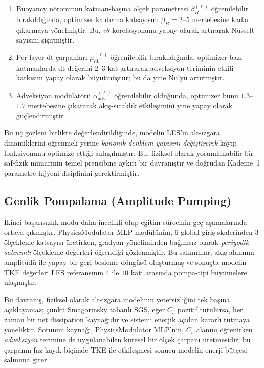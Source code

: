 \begin{enumerate}
  \item Buoyancy nöronunun katman-başına ölçek parametresi $\beta_{B}^{(\ell)}$ öğrenilebilir bırakıldığında, optimizer kaldırma katsayısını $\beta_{B}=2$--$5$ mertebesine kadar çıkarmaya yönelmiştir. Bu, $v\theta$ korelasyonunu yapay olarak artırarak Nusselt sayısını şişirmiştir.

  \item Per-layer dt çarpanları $\mu_{\mathrm{dt}}^{(\ell)}$ öğrenilebilir bırakıldığında, optimizer bazı katmanlarda dt değerini $2$--$3$ kat artırarak adveksiyon teriminin etkili katkısını yapay olarak büyütmüştür; bu da yine $\mathrm{Nu}$'yu artırmıştır.

  \item Adveksiyon modülatörü $\alpha_{\mathrm{adv}}^{(\ell)}$ öğrenilebilir olduğunda, optimizer bunu $1.3$--$1.7$ mertebesine çıkararak akış-sıcaklık etkileşimini yine yapay olarak güçlendirmiştir.
\end{enumerate}

Bu üç gözlem birlikte değerlendirildiğinde, modelin LES'in alt-ızgara dinamiklerini öğrenmek yerine \emph{kanonik denklem yapısını değiştirerek} kayıp fonksiyonunu optimize ettiği anlaşılmıştır. Bu, fiziksel olarak yorumlanabilir bir saf-fizik mimarinin temel prensibine aykırı bir davranıştır ve doğrudan Kademe~1 parametre hijyeni disiplinini gerektirmiştir.

\subsection{Genlik Pompalama (Amplitude Pumping)}

İkinci başarısızlık modu daha incelikli olup eğitim sürecinin geç aşamalarında ortaya çıkmıştır. PhysicsModulator MLP modülünün, 6 global giriş skalerinden 3 ölçekleme katsayısı üretirken, gradyan yöneliminden bağımsız olarak \emph{periyodik salınımlı} ölçekleme değerleri öğrendiği gözlenmiştir. Bu salınımlar, akış alanının amplitüdü ile yapay bir geri-besleme döngüsü oluşturmuş ve sonuçta modelin TKE değerleri LES referansının $4$ ile $10$ katı arasında pompa-tipi büyümelere ulaşmıştır.

Bu davranış, fiziksel olarak alt-ızgara modelinin yetersizliğini tek başına açıklayamaz; çünkü Smagorinsky tabanlı SGS, eğer $C_{s}$ pozitif tutulursa, her zaman bir net dissipation kaynağıdır ve sistemi enerjik açıdan kararlı tutmaya yöneliktir. Sorunun kaynağı, PhysicsModulator MLP'nin, $C_{s}$ alanını öğrenirken \emph{adveksiyon} terimine de uygulanabilen küresel bir ölçek çarpanı üretmesidir; bu çarpanın faz-kayık biçimde TKE ile etkileşmesi sonucu modelin enerji bütçesi salınıma girer.

